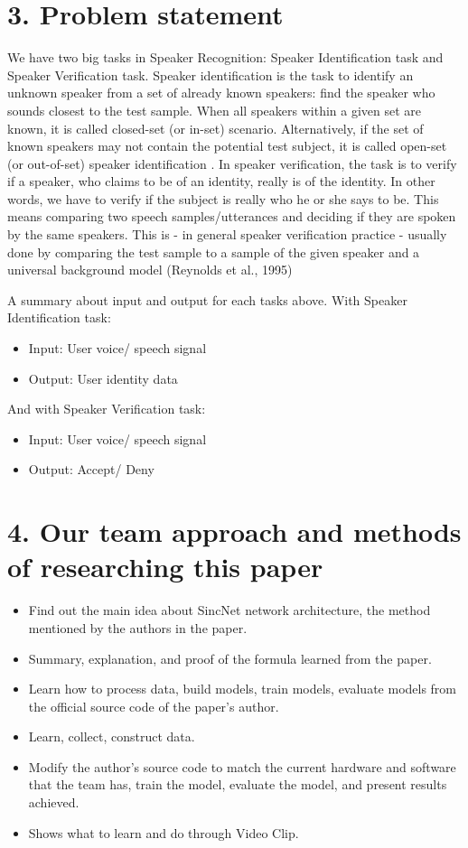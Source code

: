 \documentclass{article}
\begin{document}
	\section{3. Problem statement}
	\qquad We have two big tasks in Speaker Recognition: Speaker Identification task and Speaker Verification task. Speaker identification is the task to identify an unknown speaker from a set of already known speakers: find
	the speaker who sounds closest to the test sample. When all
	speakers within a given set are known, it is called closed-set
	(or in-set) scenario. Alternatively, if the set of known speakers
	may not contain the potential test subject, it is called open-set
	(or out-of-set) speaker identification \cite{sztaho2019deep}. In speaker verification, the task is to verify if a speaker, who claims to be of an identity, really is of the identity. In other words, we have to verify if the subject is really who he or she says to be. This means comparing two speech samples/utterances and deciding if they are spoken by the same speakers. This is - in general speaker verification practice - usually done by comparing the test sample to a sample of the given speaker and a universal background model (Reynolds et al., 1995)
	
	A summary about input and output for each tasks above. With Speaker Identification task:
	\begin{itemize}
		\item Input: User voice/ speech signal
		\item Output: User identity data
	\end{itemize}
	And with Speaker Verification task:
	\begin{itemize}
		\item Input: User voice/ speech signal
		\item Output: Accept/ Deny
	\end{itemize}

	\section{4. Our team approach and methods of researching this paper}
	\begin{itemize}
		\item Find out the main idea about SincNet network architecture, the method mentioned by the authors in the paper.
		\item Summary, explanation, and proof of the formula learned from the paper.
		\item Learn how to process data, build models, train models, evaluate models from the official source code of the paper's author.
		\item Learn, collect, construct data.
		\item Modify the author's source code to match the current hardware and software that the team has, train the model, evaluate the model, and present results achieved.
		\item Shows what to learn and do through Video Clip.
	\end{itemize}
\end{document}
